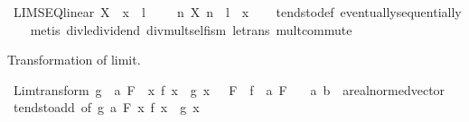 \begin{isabellebody}
\endisatagproof
{\isafoldproof}%
%
\isadelimproof
\isanewline
%
\endisadelimproof
\isanewline
{}\isamarkupfalse%
\ LIMSEQ{\isacharunderscore}{\kern0pt}linear{\isacharcolon}{\kern0pt}\ {\isachardoublequoteopen}X\ {\isasymlonglonglongrightarrow}\ x\ {\isasymLongrightarrow}\ l\ {\isachargreater}{\kern0pt}\ {}\ {\isasymLongrightarrow}\ {\isacharparenleft}{\kern0pt}{\isasymlambda}\ n{\isachardot}{\kern0pt}\ X\ {\isacharparenleft}{\kern0pt}n\ {\isacharasterisk}{\kern0pt}\ l{\isacharparenright}{\kern0pt}{\isacharparenright}{\kern0pt}\ {\isasymlonglonglongrightarrow}\ x{\isachardoublequoteclose}\isanewline
%
\isadelimproof
\ \ %
\endisadelimproof
%
\isatagproof
{}\isamarkupfalse%
\ tendsto{\isacharunderscore}{\kern0pt}def\ eventually{\isacharunderscore}{\kern0pt}sequentially\isanewline
\ \ \isamarkupfalse%
\ {\isacharparenleft}{\kern0pt}metis\ div{\isacharunderscore}{\kern0pt}le{\isacharunderscore}{\kern0pt}dividend\ div{\isacharunderscore}{\kern0pt}mult{\isacharunderscore}{\kern0pt}self{}{\isacharunderscore}{\kern0pt}is{\isacharunderscore}{\kern0pt}m\ le{\isacharunderscore}{\kern0pt}trans\ mult{\isachardot}{\kern0pt}commute{\isacharparenright}{\kern0pt}%
\endisatagproof
{\isafoldproof}%
%
\isadelimproof
%
\endisadelimproof
%
\begin{isamarkuptext}%
Transformation of limit.%
\end{isamarkuptext}\isamarkuptrue%
\isamarkupfalse%
\ Lim{\isacharunderscore}{\kern0pt}transform{\isacharcolon}{\kern0pt}\ {\isachardoublequoteopen}{\isacharparenleft}{\kern0pt}g\ {\isasymlonglongrightarrow}\ a{\isacharparenright}{\kern0pt}\ F\ {\isasymLongrightarrow}\ {\isacharparenleft}{\kern0pt}{\isacharparenleft}{\kern0pt}{\isasymlambda}x{\isachardot}{\kern0pt}\ f\ x\ {\isacharminus}{\kern0pt}\ g\ x{\isacharparenright}{\kern0pt}\ {\isasymlonglongrightarrow}\ {}{\isacharparenright}{\kern0pt}\ F\ {\isasymLongrightarrow}\ {\isacharparenleft}{\kern0pt}f\ {\isasymlonglongrightarrow}\ a{\isacharparenright}{\kern0pt}\ F{\isachardoublequoteclose}\isanewline
\ \ \ a\ b\ {\isacharcolon}{\kern0pt}{\isacharcolon}{\kern0pt}\ {\isachardoublequoteopen}{\isacharprime}{\kern0pt}a{\isacharcolon}{\kern0pt}{\isacharcolon}{\kern0pt}real{\isacharunderscore}{\kern0pt}normed{\isacharunderscore}{\kern0pt}vector{\isachardoublequoteclose}\isanewline
%
\isadelimproof
\ \ %
\endisadelimproof
%
\isatagproof
{}\isamarkupfalse%
\ tendsto{\isacharunderscore}{\kern0pt}add\ {\isacharbrackleft}{\kern0pt}of\ g\ a\ F\ {\isachardoublequoteopen}{\isasymlambda}x{\isachardot}{\kern0pt}\ f\ x\ {\isacharminus}{\kern0pt}\ g\ x{\isachardoublequoteclose}\ {}{\isacharbrackright}{\kern0pt}\ \isamarkupfalse%

\end{isabellebody}
